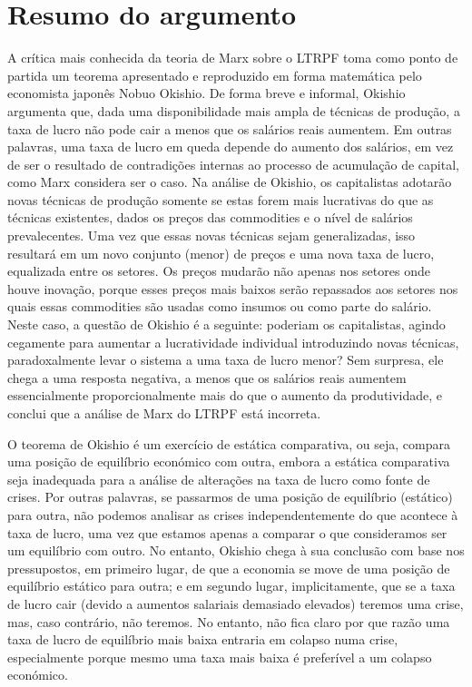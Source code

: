\section{Resumo do argumento}
 \par 
A crítica mais conhecida da teoria de Marx sobre o LTRPF toma como ponto de partida um teorema apresentado e reproduzido em forma matemática pelo economista japonês Nobuo Okishio. De forma breve e informal, Okishio argumenta que, dada uma disponibilidade mais ampla de técnicas de produção, a taxa de lucro não pode cair a menos que os salários reais aumentem. Em outras palavras, uma taxa de lucro em queda depende do aumento dos salários, em vez de ser o resultado de contradições internas ao processo de acumulação de capital, como Marx considera ser o caso. Na análise de Okishio, os capitalistas adotarão novas técnicas de produção somente se estas forem mais lucrativas do que as técnicas existentes, dados os preços das commodities e o nível de salários prevalecentes. Uma vez que essas novas técnicas sejam generalizadas, isso resultará em um novo conjunto (menor) de preços e uma nova taxa de lucro, equalizada entre os setores. Os preços mudarão não apenas nos setores onde houve inovação, porque esses preços mais baixos serão repassados ​​aos setores nos quais essas commodities são usadas como insumos ou como parte do salário. Neste caso, a questão de Okishio é a seguinte: poderiam os capitalistas, agindo cegamente para aumentar a lucratividade individual introduzindo novas técnicas, paradoxalmente levar o sistema a uma taxa de lucro menor? Sem surpresa, ele chega a uma resposta negativa, a menos que os salários reais aumentem essencialmente proporcionalmente mais do que o aumento da produtividade, e conclui que a análise de Marx do LTRPF está incorreta.
 \par 
O teorema de Okishio é um exercício de estática comparativa, ou seja, compara uma posição de equilíbrio económico com outra, embora a estática comparativa seja inadequada para a análise de alterações na taxa de lucro como fonte de crises. Por outras palavras, se passarmos de uma posição de equilíbrio (estático) para outra, não podemos analisar as crises independentemente do que acontece à taxa de lucro, uma vez que estamos apenas a comparar o que consideramos ser um equilíbrio com outro. No entanto, Okishio chega à sua conclusão com base nos pressupostos, em primeiro lugar, de que a economia se move de uma posição de equilíbrio estático para outra; e em segundo lugar, implicitamente, que se a taxa de lucro cair (devido a aumentos salariais demasiado elevados) teremos uma crise, mas, caso contrário, não teremos. No entanto, não fica claro por que razão uma taxa de lucro de equilíbrio mais baixa entraria em colapso numa crise, especialmente porque mesmo uma taxa mais baixa é preferível a um colapso económico.
